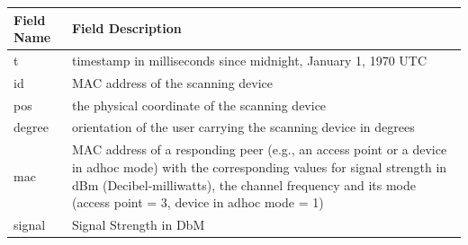 \documentclass[
]{article}
\begin{document}
\begin{longtable}[]{@{}ll@{}}
\toprule
\begin{minipage}[b]{0.34\columnwidth}\raggedright
Field Name\strut
\end{minipage} & \begin{minipage}[b]{0.60\columnwidth}\raggedright
Field Description\strut
\end{minipage}\tabularnewline
\midrule
\endhead
\begin{minipage}[t]{0.34\columnwidth}\raggedright
t\strut
\end{minipage} & \begin{minipage}[t]{0.60\columnwidth}\raggedright
timestamp in milliseconds since midnight, January 1, 1970 UTC\strut
\end{minipage}\tabularnewline
\begin{minipage}[t]{0.34\columnwidth}\raggedright
id\strut
\end{minipage} & \begin{minipage}[t]{0.60\columnwidth}\raggedright
MAC address of the scanning device\strut
\end{minipage}\tabularnewline
\begin{minipage}[t]{0.34\columnwidth}\raggedright
pos\strut
\end{minipage} & \begin{minipage}[t]{0.60\columnwidth}\raggedright
the physical coordinate of the scanning device\strut
\end{minipage}\tabularnewline
\begin{minipage}[t]{0.34\columnwidth}\raggedright
degree\strut
\end{minipage} & \begin{minipage}[t]{0.60\columnwidth}\raggedright
orientation of the user carrying the scanning device in degrees\strut
\end{minipage}\tabularnewline
\begin{minipage}[t]{0.34\columnwidth}\raggedright
mac\strut
\end{minipage} & \begin{minipage}[t]{0.60\columnwidth}\raggedright
MAC address of a responding peer (e.g., an access point or a device in
adhoc mode) with the corresponding values for signal strength in dBm
(Decibel-milliwatts), the channel frequency and its mode (access point =
3, device in adhoc mode = 1)\strut
\end{minipage}\tabularnewline
\begin{minipage}[t]{0.34\columnwidth}\raggedright
signal\strut
\end{minipage} & \begin{minipage}[t]{0.60\columnwidth}\raggedright
Signal Strength in DbM\strut
\end{minipage}\tabularnewline
\bottomrule
\end{longtable}
\end{document}

